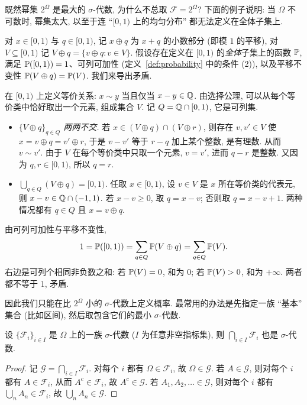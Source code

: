 既然幂集 $2^\Omega$ 是最大的 $\sigma$-代数, 为什么不总取 $\mathcal{F}=2^\Omega$? 下面的例子说明: 当 $\Omega$ 不可数时, 幂集太大, 以至于连 ``$[0,1)$ 上的均匀分布'' 都无法定义在全体子集上.

\begin{example}[Vitali 集]\label{ex:vitali}
对 $x\in[0,1)$ 与 $q\in[0,1)$, 记 $x\oplus q$ 为 $x+q$ 的小数部分 (即模 $1$ 的平移), 对 $V\subseteq[0,1)$ 记 $V\oplus q=\{v\oplus q: v\in V\}$. 假设存在定义在 $[0,1)$ 的\emph{全体}子集上的函数 $\P$, 满足 $\P([0,1))=1$、可列可加性 (定义~\ref{def:probability} 中的条件 (2)), 以及平移不变性 $\P(V\oplus q)=\P(V)$. 我们来导出矛盾.

在 $[0,1)$ 上定义等价关系: $x\sim y$ 当且仅当 $x-y\in\Q$. 由选择公理, 可以从每个等价类中恰好取出一个元素, 组成集合 $V$. 记 $Q=\Q\cap[0,1)$, 它是可列集.
\begin{itemize}
\item \emph{$\{V\oplus q\}_{q\in Q}$ 两两不交.} 若 $x\in(V\oplus q)\cap(V\oplus r)$, 则存在 $v,v'\in V$ 使 $x=v\oplus q=v'\oplus r$, 于是 $v-v'$ 等于 $r-q$ 加上某个整数, 是有理数. 从而 $v\sim v'$. 由于 $V$ 在每个等价类中只取一个元素, $v=v'$, 进而 $q-r$ 是整数. 又因为 $q,r\in[0,1)$, 所以 $q=r$.
\item \emph{$\bigcup_{q\in Q}(V\oplus q)=[0,1)$.} 任取 $x\in[0,1)$, 设 $v\in V$ 是 $x$ 所在等价类的代表元, 则 $x-v\in\Q\cap(-1,1)$. 若 $x-v\ge 0$, 取 $q=x-v$; 否则取 $q=x-v+1$. 两种情况都有 $q\in Q$ 且 $x=v\oplus q$.
\end{itemize}
由可列可加性与平移不变性,
\[
1=\P([0,1))=\sum_{q\in Q}\P(V\oplus q)=\sum_{q\in Q}\P(V).
\]
右边是可列个相同非负数之和: 若 $\P(V)=0$, 和为 $0$; 若 $\P(V)>0$, 和为 $+\infty$. 两者都不等于 $1$, 矛盾.
\end{example}

因此我们只能在比 $2^\Omega$ 小的 $\sigma$-代数上定义概率. 最常用的办法是先指定一族 ``基本'' 集合 (比如区间), 然后取包含它们的最小 $\sigma$-代数.

\begin{lemma}\label{lem:intersection-sigma}
设 $\{\mathcal{F}_i\}_{i\in I}$ 是 $\Omega$ 上的一族 $\sigma$-代数 ($I$ 为任意非空指标集), 则 $\bigcap_{i\in I}\mathcal{F}_i$ 也是 $\sigma$-代数.
\end{lemma}

\begin{proof}
记 $\mathcal{G}=\bigcap_{i\in I}\mathcal{F}_i$. 对每个 $i$ 都有 $\Omega\in\mathcal{F}_i$, 故 $\Omega\in\mathcal{G}$. 若 $A\in\mathcal{G}$, 则对每个 $i$ 都有 $A\in\mathcal{F}_i$, 从而 $A^c\in\mathcal{F}_i$, 故 $A^c\in\mathcal{G}$. 若 $A_1,A_2,\dots\in\mathcal{G}$, 则对每个 $i$ 都有 $\bigcup_n A_n\in\mathcal{F}_i$, 故 $\bigcup_n A_n\in\mathcal{G}$.
\end{proof}

